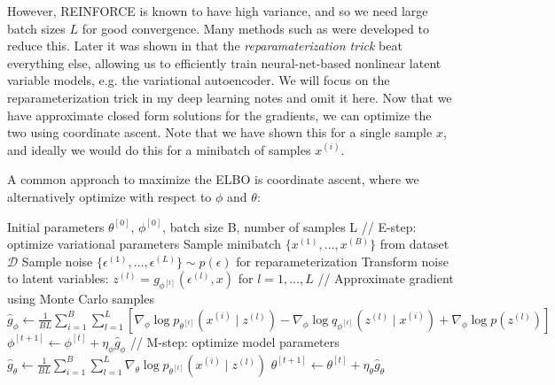 \documentclass{article}
\begin{document}
  However, REINFORCE is known to have high variance, and so we need large batch sizes $L$ for good convergence. Many methods such as \cite{reduce, reduce2} were developed to reduce this. Later it was shown in \cite{vae1} that the \textit{reparamaterization trick} beat everything else, allowing us to efficiently train neural-net-based nonlinear latent variable models, e.g. the variational autoencoder. We will focus on the reparameterization trick in my deep learning notes and omit it here.  Now that we have approximate closed form solutions for the gradients, we can optimize the two using coordinate ascent. Note that we have shown this for a single sample $x$, and ideally we would do this for a minibatch of samples $x^{(i)}$. 

  \begin{algo}
    A common approach to maximize the ELBO is coordinate ascent, where we alternatively optimize with respect to $\phi$ and $\theta$:

    \begin{algorithm}[H]
      \caption{Coordinate Ascent Variational Inference (CAVI) with Reparameterization}
      \begin{algorithmic}[1]
        \Require Initial parameters $\theta^{[0]}$, $\phi^{[0]}$, batch size B, number of samples L
          \State // E-step: optimize variational parameters
          \State Sample minibatch $\{x^{(1)}, \ldots, x^{(B)}\}$ from dataset $\mathcal{D}$
          \State Sample noise $\{\epsilon^{(1)}, \ldots, \epsilon^{(L)}\} \sim p(\epsilon)$ for reparameterization
          \State Transform noise to latent variables: $z^{(l)} = g_{\phi^{[t]}}(\epsilon^{(l)}, x)$ for $l=1,\ldots,L$
          \State // Approximate gradient using Monte Carlo samples
          \State $\hat{g}_\phi \gets \frac{1}{BL} \sum_{i=1}^B \sum_{l=1}^L [\nabla_\phi \log p_{\theta^{[t]}}(x^{(i)} \mid z^{(l)}) - \nabla_\phi \log q_{\phi^{[t]}}(z^{(l)} \mid x^{(i)}) + \nabla_\phi \log p(z^{(l)})]$
          \State $\phi^{[t+1]} \gets \phi^{[t]} + \eta_\phi \hat{g}_\phi$ 
          \State // M-step: optimize model parameters
          \State $\hat{g}_\theta \gets \frac{1}{BL} \sum_{i=1}^B \sum_{l=1}^L \nabla_\theta \log p_{\theta^{[t]}}(x^{(i)} \mid z^{(l)})$
          \State $\theta^{[t+1]} \gets \theta^{[t]} + \eta_\theta \hat{g}_\theta$ 
        \EndWhile
      \end{algorithmic}
    \end{algorithm}
  \end{algo} 
\end{document}
